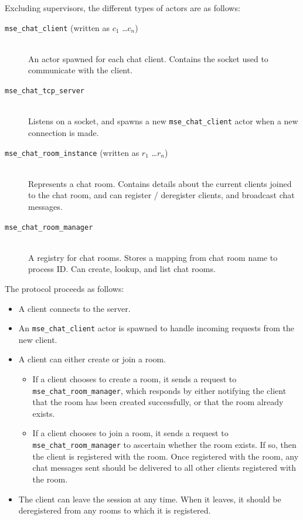 \documentclass[a4paper]{article}
\begin{document}
Excluding supervisors, the different types of actors are as follows:

\begin{description}
\item[\texttt{mse\_chat\_client} (written as $c_1$ \ldots $c_n$)] \hfill \\
An actor spawned for each chat client. Contains the socket used to communicate with the client.
\item[\texttt{mse\_chat\_tcp\_server}] \hfill \\
Listens on a socket, and spawns a new \texttt{mse\_chat\_client} actor when a new connection is made.
\item[\texttt{mse\_chat\_room\_instance} (written as $r_1$ \ldots $r_n$)] \hfill \\
Represents a chat room. Contains details about the current clients joined to the chat room, and can register / deregister clients, and broadcast chat messages.
\item[\texttt{mse\_chat\_room\_manager}] \hfill \\
A registry for chat rooms. Stores a mapping from chat room name to process ID. Can create, lookup, and list chat rooms.
\end{description}

The protocol proceeds as follows:

\begin{itemize}
\item A client connects to the server.
\item An \texttt{mse\_chat\_client} actor is spawned to handle incoming requests from the new client.
\item A client can either create or join a room. 
\begin{itemize}
\item If a client chooses to create a room, it sends a request to \texttt{mse\_chat\_room\_manager}, which responds by either notifying the client that the room has been created successfully, or that the room already exists.
\item If a client chooses to join a room, it sends a request to \texttt{mse\_chat\_room\_manager} to ascertain whether the room exists. If so, then the client is registered with the room. Once registered with the room, any chat messages sent should be delivered to all other clients registered with the room.
\end{itemize}
\item The client can leave the session at any time. When it leaves, it should be deregistered from any rooms to which it is registered.
\end{itemize}
\end{document}
